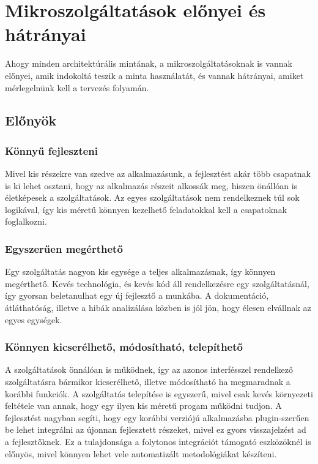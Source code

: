 \documentclass[11pt,magyar,a4paper,twoside,]{report}
\begin{document}
\section{Mikroszolgáltatások előnyei és
hátrányai}\label{mikroszolguxe1ltatuxe1sok-elux151nyei-uxe9s-huxe1truxe1nyai}

Ahogy minden architektúrális mintának, a mikroszolgáltatásoknak is
vannak előnyei\citep{microservices}, amik indokoltá teszik a minta
használatát, és vannak hátrányai\citep{micro-disadv}, amiket
mérlegelnünk kell a tervezés folyamán.

\subsection{Előnyök}\label{elux151nyuxf6k}

\subsubsection{Könnyű fejleszteni}\label{kuxf6nnyux171-fejleszteni}

Mivel kis részekre van szedve az alkalmazásunk, a fejlesztést akár több
csapatnak is ki lehet osztani, hogy az alkalmazás részeit alkossák meg,
hiszen önállóan is életképesek a szolgáltatások. Az egyes szolgáltatások
nem rendelkeznek túl sok logikával, így kis méretű könnyen kezelhető
feladatokkal kell a csapatoknak foglalkozni.

\subsubsection{Egyszerűen
megérthető}\label{egyszerux171en-meguxe9rthetux151}

Egy szolgáltatás nagyon kis egysége a teljes alkalmazásnak, így könnyen
megérthető. Kevés technológia, és kevés kód áll rendelkezésre egy
szolgáltatásnál, így gyorsan beletanulhat egy új fejlesztő a munkába. A
dokumentáció, átláthatóság, illetve a hibák analizálása közben is jól
jön, hogy élesen elvállnak az egyes egységek.

\subsubsection{Könnyen kicserélhető, módosítható,
telepíthető}\label{kuxf6nnyen-kicseruxe9lhetux151-muxf3dosuxedthatuxf3-telepuxedthetux151}

A szolgáltatások önnálóan is működnek, így az azonos interfésszel
rendelkező szolgáltatásra bármikor kicserélhető, illetve módosítható ha
megmaradnak a korábbi funkciók. A szolgáltatás telepítése is egyszerű,
mivel csak kevés környezeti feltétele van annak, hogy egy ilyen kis
méretű progam működni tudjon. A fejlesztést nagyban segíti, hogy egy
korábbi verziójú alkalmazásba plugin-szerűen be lehet integrálni az
újonnan fejlesztett részeket, mivel ez gyors visszajelzést ad a
fejlesztőknek. Ez a tulajdonsága a folytonos integrációt támogató
eszközöknél is előnyös, mivel könnyen lehet vele automatizált
metodológiákat készíteni.
\end{document}
